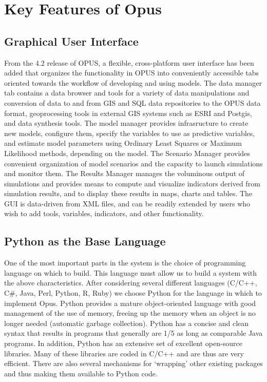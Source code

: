 \section{Key Features of Opus}
\subsection{Graphical User Interface}
From the 4.2 release of OPUS, a flexible, cross-platform user interface has been added that organizes the functionality in OPUS into conveniently accessible tabs oriented towards the workflow of developing and using models.  The data manager tab contains a data browser and tools for a variety of data manipulations and conversion of data to and from GIS and SQL data repositories to the OPUS data format, geoprocessing tools in external GIS systems such as ESRI and Postgis, and data synthesis tools.  The model manager provides infrasructure to create new models, configure them, specify the variables to use as predictive variables, and estimate model parameters using Ordinary Least Squares or Maximum Likelihood methods, depending on the model.  The Scenario Manager provides convenient organization of model scenarios and the capacity to launch simulations and monitor them.  The Results Manager manages the voluminous output of simulations and provides means to compute and visualize indicators derived from simulation results, and to display these results in maps, charts and tables.  The GUI is data-driven from XML files, and can be readily extended by users who wish to add tools,  variables, indicators, and other functionality.

\subsection{Python as the Base Language}
One of the most important parts in the system is the choice of programming language on which to build.  This language must allow us to build a system with the above characteristics.  
After considering several different languages (C/C++, C\#, Java, Perl, Python, R, Ruby) we choose Python for the language in which to implement Opus. Python provides a mature object-oriented language with good management of the use of memory, freeing up the memory when an object is no longer needed (automatic garbage collection).  Python has a concise and clean syntax that results in programs that generally are 1/5 as long as comparable Java programs.  In addition, Python has an extensive set of excellent open-source libraries.  Many of these libraries are coded in C/C++ and are thus are very efficient.  There are also several mechanisms for `wrapping' other existing packages and thus making them available to Python code.  

